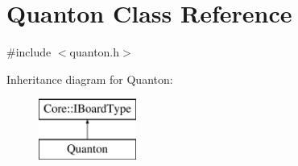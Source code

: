 \hypertarget{class_quanton}{\section{\-Quanton \-Class \-Reference}
\label{class_quanton}
}


{\ttfamily \#include $<$quanton.\-h$>$}

\-Inheritance diagram for \-Quanton\-:\begin{figure}[H]
\begin{center}
\leavevmode
\includegraphics[height=2.000000cm]{class_quanton}
\end{center}
\end{figure}
